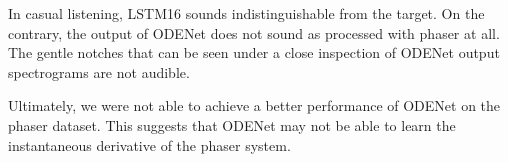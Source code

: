 In casual listening, \ac{LSTM}16 sounds indistinguishable from the target. On the contrary, the output of ODENet does not sound as processed with phaser at all. The gentle notches that can be seen under a close inspection of ODENet output spectrograms are not audible.

Ultimately, we were not able to achieve a better performance of ODENet on the phaser dataset. This suggests that ODENet may not be able to learn the instantaneous derivative of the phaser system.
